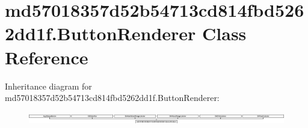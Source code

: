 \hypertarget{classmd57018357d52b54713cd814fbd5262dd1f_1_1ButtonRenderer}{}\section{md57018357d52b54713cd814fbd5262dd1f.\+Button\+Renderer Class Reference}
\label{classmd57018357d52b54713cd814fbd5262dd1f_1_1ButtonRenderer}
Inheritance diagram for md57018357d52b54713cd814fbd5262dd1f.\+Button\+Renderer\+:\begin{figure}[H]
\begin{center}
\leavevmode
\includegraphics[height=0.528801cm]{classmd57018357d52b54713cd814fbd5262dd1f_1_1ButtonRenderer}
\end{center}
\end{figure}
